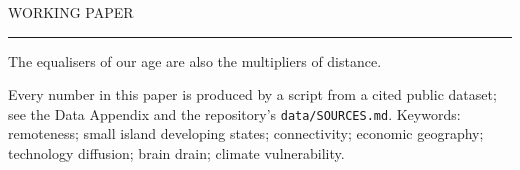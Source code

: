 \begin{titlepage}
\thispagestyle{empty}

{\sffamily\footnotesize\color{slate}\MakeUppercase{Working Paper}\enspace\textbar\enspace
 \liningfigures\the\year\par}
\vspace{1.6in}

{\fontsize{46}{48}\selectfont\color{teal}\papertitle\par}
\vspace{10pt}
{\fontsize{20}{25}\selectfont\itshape\color{ink}\papersubtitle\par}
\vspace{18pt}
{\color{ember}\rule{1.4in}{2pt}\par}
\vspace{18pt}
{\large\scshape\color{ink}\paperauthor\par}

\vspace{0.8in}
\begin{minipage}{0.82\linewidth}
\begin{pullquote}
The equalisers of our age are also the multipliers of distance.
\end{pullquote}
\end{minipage}

\vfill
\begin{abstractbox}

\end{abstractbox}

\vspace{10pt}
{\sffamily\scriptsize\color{slate}
Every number in this paper is produced by a script from a cited public
dataset; see the Data Appendix and the repository's \texttt{data/SOURCES.md}.
Keywords: remoteness; small island developing states; connectivity;
economic geography; technology diffusion; brain drain; climate vulnerability.\par}
\restoregeometry
\end{titlepage}
